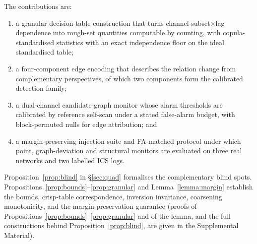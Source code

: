 \documentclass[11pt,a4paper]{article}
\begin{document}
The contributions are:
\begin{enumerate}\itemsep2pt
\item a granular decision-table construction that turns channel-subset$\times$lag
dependence into rough-set quantities computable by counting, with
copula-standardised statistics with an exact independence floor on the
ideal standardised table;
\item a four-component edge encoding that describes the relation change
from complementary perspectives, of which two components form the
calibrated detection family;
\item a dual-channel candidate-graph monitor whose alarm thresholds are
calibrated by reference self-scan under a stated false-alarm budget, with
block-permuted nulls for edge attribution; and
\item a margin-preserving injection suite and FA-matched protocol under
which point, graph-deviation and structural monitors are evaluated on three
real networks and two labelled ICS logs.
\end{enumerate}

Proposition~\ref{prop:blind} in §\ref{sec:quad}
formalises the complementary blind spots. Propositions~\ref{prop:bounds}--\ref{prop:granular} and Lemma~\ref{lemma:margin} establish the bounds,
crisp-table correspondence, inversion invariance, coarsening monotonicity,
and the margin-preservation guarantee (proofs of
Propositions~\ref{prop:bounds}--\ref{prop:granular} and of the lemma, and
the full constructions behind Proposition~\ref{prop:blind}, are
given in the Supplemental Material).
\end{document}
